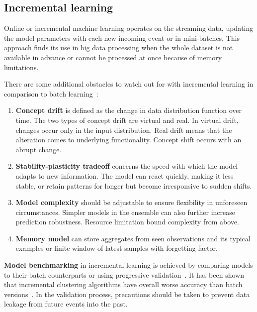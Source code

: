 \subsection{Incremental learning}
Online or incremental machine learning operates on the streaming data, updating the model parameters with each new incoming event or in mini-batches. This approach finds its use in big data processing when the whole dataset is not available in advance or cannot be processed at once because of memory limitations.

There are some additional obstacles to watch out for with incremental learning in comparison to batch learning~\cite{gepperth_incremental_2016}:

\begin{enumerate}
    \itemsep0pt

    \item \textbf{Concept drift} is defined as the change in data distribution function over time. The two types of concept drift are virtual and real. In virtual drift, changes occur only in the input distribution. Real drift means that the alteration comes to underlying functionality. Concept shift occurs with an abrupt change.

    \item \textbf{Stability-plasticity tradeoff} concerns the speed with which the model adapts to new information. The model can react quickly, making it less stable, or retain patterns for longer but become irresponsive to sudden shifts.

    \item \textbf{Model complexity} should be adjustable to ensure flexibility in unforeseen circumstances. Simpler models in the ensemble can also further increase prediction robustness. Resource limitation bound complexity from above.

    \item \textbf{Memory model} can store aggregates from seen observations and its typical examples or finite window of latest samples with forgetting factor.
\end{enumerate}


\textbf{Model benchmarking} in incremental learning is achieved by comparing models to their batch counterparts or using progressive validation~\cite{blum_beating_1999, halford_correct_2020}. It has been shown that incremental clustering algorithms have overall worse accuracy than batch versions~\cite{gepperth_incremental_2016}. In the validation process, precautions should be taken to prevent data leakage from future events into the past.

